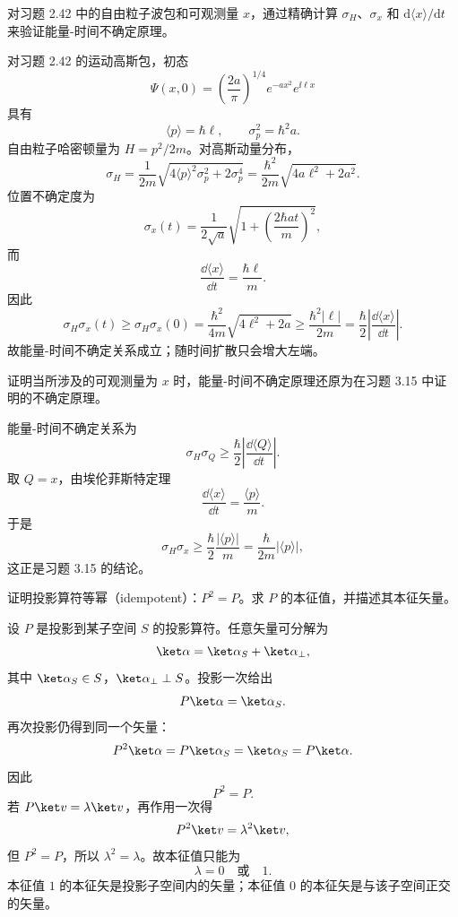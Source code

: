 \begin{question}
对习题 2.42 中的自由粒子波包和可观测量 $x$，通过精确计算 $\sigma_H$、$\sigma_x$ 和 $\mathrm d\langle x\rangle/\mathrm dt$ 来验证能量-时间不确定原理。
\end{question}
\begin{solution}
对习题 2.42 的运动高斯包，初态
\[
\Psi(x,0)=\left(\frac{2a}{\pi}\right)^{1/4}e^{-ax^2}e^{\ii\ell x}
\]
具有
\[
\langle p\rangle=\hbar\ell,
\qquad
\sigma_p^2=\hbar^2a.
\]
自由粒子哈密顿量为 $H=p^2/2m$。对高斯动量分布，
\[
\sigma_H=\frac1{2m}\sqrt{4\langle p\rangle^2\sigma_p^2+2\sigma_p^4}
=\frac{\hbar^2}{2m}\sqrt{4a\ell^2+2a^2}.
\]
位置不确定度为
\[
\sigma_x(t)=\frac1{2\sqrt a}\sqrt{1+\left(\frac{2\hbar at}{m}\right)^2},
\]
而
\[
\frac{\dd\langle x\rangle}{\dd t}=\frac{\hbar\ell}{m}.
\]
因此
\[
\sigma_H\sigma_x(t)
\ge \sigma_H\sigma_x(0)
=\frac{\hbar^2}{4m}\sqrt{4\ell^2+2a}
\ge \frac{\hbar^2|\ell|}{2m}
=\frac\hbar2\left|\frac{\dd\langle x\rangle}{\dd t}\right|.
\]
故能量-时间不确定关系成立；随时间扩散只会增大左端。
\end{solution}

\begin{question}
证明当所涉及的可观测量为 $x$ 时，能量-时间不确定原理还原为在习题 3.15 中证明的不确定原理。
\end{question}
\begin{solution}
能量-时间不确定关系为
\[
\sigma_H\sigma_Q\ge \frac\hbar2\left|\frac{\dd\langle Q\rangle}{\dd t}\right|.
\]
取 $Q=x$，由埃伦菲斯特定理
\[
\frac{\dd\langle x\rangle}{\dd t}=\frac{\langle p\rangle}{m}.
\]
于是
\[
\sigma_H\sigma_x\ge \frac\hbar2\frac{|\langle p\rangle|}{m}
=\frac{\hbar}{2m}|\langle p\rangle|,
\]
这正是习题 3.15 的结论。
\end{solution}

\begin{question}
证明投影算符等幂（idempotent）：$P^2=P$。求 $P$ 的本征值，并描述其本征矢量。
\end{question}
\begin{solution}
设 $P$ 是投影到某子空间 $S$ 的投影算符。任意矢量可分解为
\[
\ket\alpha=\ket\alpha_S+\ket\alpha_\perp,
\]
其中 $\ket\alpha_S\in S$，$\ket\alpha_\perp\perp S$。投影一次给出
\[
P\ket\alpha=\ket\alpha_S.
\]
再次投影仍得到同一个矢量：
\[
P^2\ket\alpha=P\ket\alpha_S=\ket\alpha_S=P\ket\alpha.
\]
因此
\[
\boxed{P^2=P.}
\]
若 $P\ket v=\lambda\ket v$，再作用一次得
\[
P^2\ket v=\lambda^2\ket v,
\]
但 $P^2=P$，所以 $\lambda^2=\lambda$。故本征值只能为
\[
\boxed{\lambda=0\quad\text{或}\quad 1.}
\]
本征值 $1$ 的本征矢是投影子空间内的矢量；本征值 $0$ 的本征矢是与该子空间正交的矢量。
\end{solution}

